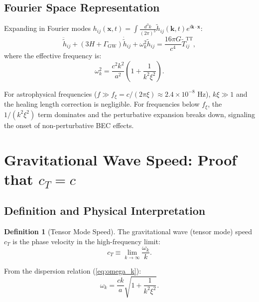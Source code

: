 \documentclass[11pt,a4paper]{article}
\newcommand{\cT}{\ensuremath{c_T}}
\theoremstyle{definition}
\newtheorem{definition}[theorem]{Definition}
\theoremstyle{remark}
\begin{document}
\subsection{Fourier Space Representation}
\label{sec:fourier_space}

Expanding in Fourier modes $h_{ij}(\mathbf{x},t) = \int \frac{d^3k}{(2\pi)^3}\tilde{h}_{ij}(\mathbf{k},t)e^{i\mathbf{k}\cdot\mathbf{x}}$:
\begin{equation}
\label{eq:tensor_fourier}
\ddot{\tilde{h}}_{ij} + (3H + \Gamma_{\mathrm{GW}})\dot{\tilde{h}}_{ij} + \omega_k^2\tilde{h}_{ij} = \frac{16\pi G}{c^4}\tilde{T}_{ij}^{\mathrm{TT}},
\end{equation}
where the effective frequency is:
\begin{equation}
\label{eq:omega_k}
\omega_k^2 = \frac{c^2 k^2}{a^2}\left(1 + \frac{1}{k^2\xi^2}\right).
\end{equation}

For astrophysical frequencies ($f \gg f_\xi = c/(2\pi\xi) \approx 2.4 \times 10^{-8}$ Hz), $k\xi \gg 1$ and the healing length correction is negligible. For frequencies below $f_\xi$, the $1/(k^2\xi^2)$ term dominates and the perturbative expansion breaks down, signaling the onset of non-perturbative BEC effects.

\section{Gravitational Wave Speed: Proof that $\cT = c$}
\label{sec:speed_proof}

\subsection{Definition and Physical Interpretation}
\label{sec:speed_definition}

\begin{definition}[Tensor Mode Speed]
The gravitational wave (tensor mode) speed $\cT$ is the phase velocity in the high-frequency limit:
\begin{equation}
\cT \equiv \lim_{k\to\infty}\frac{\omega_k}{k}.
\end{equation}
\end{definition}

From the dispersion relation (\ref{eq:omega_k}):
\begin{equation}
\omega_k = \frac{ck}{a}\sqrt{1 + \frac{1}{k^2\xi^2}}.
\end{equation}
\end{document}
